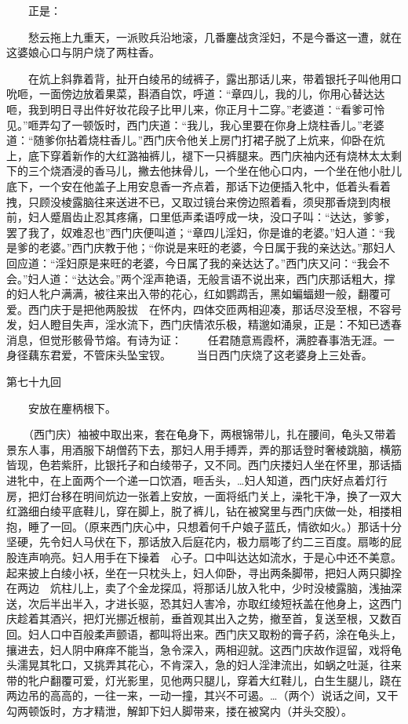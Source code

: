 　　正是：

　　愁云拖上九重天，一派败兵沿地滚，几番鏖战贪淫妇，不是今番这一遭，就在这婆娘心口与阴户烧了两柱香。


　　在炕上斜靠着背，扯开白绫吊的绒裤子，露出那话儿来，带着银托子叫他用口吮咂，一面傍边放着果菜，斟酒自饮，呼道：“章四儿，我的儿，你用心替达达咂，我到明日寻出件好妆花段子比甲儿来，你正月十二穿。”老婆道：“看爹可怜见。”咂弄勾了一顿饭时，西门庆道：“我儿，我心里要在你身上烧柱香儿。”老婆道：“随爹你拈着烧柱香儿。”西门庆令他关上房门打裙子脱了上炕来，仰卧在炕上，底下穿着新作的大红潞袖裤儿，褪下一只裤腿来。西门庆袖内还有烧林太太剩下的三个烧酒浸的香马儿，撇去他抹骨儿，一个坐在他心口内，一个坐在他小肚儿底下，一个安在他盖子上用安息香一齐点着，那话下边便插入牝中，低着头看着拽，只顾没棱露脑往来送进不已，又取过镜台来傍边照着看，须臾那香烧到肉根前，妇人蹙眉齿止忍其疼痛，口里低声柔语哼成一块，没口子叫：“达达，爹爹，罢了我了，奴难忍也”西门庆便叫道；“章四儿淫妇，你是谁的老婆。”妇人道：“我是爹的老婆。”西门庆教于他；“你说是来旺的老婆，今日属于我的亲达达。”那妇人回应道：“淫妇原是来旺的老婆，今日属了我的亲达达了。”西门庆又问：“我会不会。”妇人道：“达达会。”两个淫声艳语，无般言语不说出来，西门庆那话粗大，撑的妇人牝户满满，被往来出入带的花心，红如鹦鹉舌，黑如蝙蝠翅一般，翻覆可爱。西门庆于是把他两股拔　在怀内，四体交匝两相迎凑，那话尽没至根，不容号发，妇人瞪目失声，淫水流下，西门庆情浓乐极，精邈如涌泉，正是：不知已透春消息，但觉形骸骨节熔。有诗为证：
　　任君随意焉霞杯，满腔春事浩无涯。一身径藕东君爱，不管床头坠宝钗。
　　当日西门庆烧了这老婆身上三处香。


第七十九回

　　安放在麈柄根下。


　　（西门庆）袖被中取出来，套在龟身下，两根锦带儿，扎在腰间，龟头又带着景东人事，用酒服下胡僧药下去，那妇人用手搏弄，弄的那话登时奢棱跳脑，横筋皆现，色若紫肝，比银托子和白绫带子，又不同。西门庆搂妇人坐在怀里，那话插进牝中，在上面两个一个递一口饮酒，咂舌头，…妇人知道，西门庆好点着灯行房，把灯台移在明间炕边一张着上安放，一面将纸门关上，澡牝干净，换了一双大红潞细白绫平底鞋儿，穿在脚上，脱了裤儿，钻在被窝里与西门庆做一处，相搂相抱，睡了一回。（原来西门庆心中，只想着何千户娘子蓝氏，情欲如火。）那话十分坚硬，先令妇人马伏在下，那话放入后庭花内，极力扇嘭了约二三百度。扇嘭的屁股连声响亮。妇人用手在下操着　心子。口中叫达达如流水，于是心中还不美意。起来披上白绫小袄，坐在一只枕头上，妇人仰卧，寻出两条脚带，把妇人两只脚拴在两边　炕柱儿上，卖了个金龙探瓜，将那话儿放入牝中，少时没棱露脑，浅抽深送，次后半出半入，才进长驱，恐其妇人害冷，亦取红绫短袄盖在他身上，这西门庆趁着其酒兴，把灯光挪近根前，垂首观其出入之势，撤至首，复送至根，又数百回。妇人口中百般柔声颤语，都叫将出来。西门庆又取粉的膏子药，涂在龟头上，攘进去，妇人阴中麻痒不能当，急令深入，两相迎就。这西门庆故作逗留，戏将龟头濡晃其牝口，又挑弄其花心，不肯深入，急的妇人淫津流出，如蜗之吐涎，往来带的牝户翻覆可爱，灯光影里，见他两只腿儿，穿着大红鞋儿，白生生腿儿，跷在两边吊的高高的，一往一来，一动一撞，其兴不可遏。…（两个）说话之间，又干勾两顿饭时，方才精泄，解卸下妇人脚带来，搂在被窝内（并头交股）。


